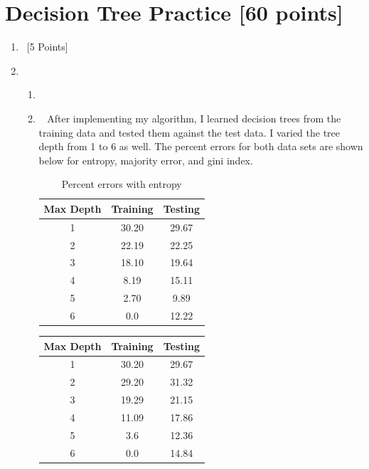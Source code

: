 \documentclass[12pt, fullpage,letterpaper]{article}
\begin{document}
\section{Decision Tree Practice [60 points]}
\begin{enumerate}
	\item~[5 Points] 


\item~



\begin{enumerate}
\item~

\item~ 
	After implementing my algorithm, I learned decision trees from the training data and tested them against the test data. I varied the tree depth from 1 to 6 as well. The percent errors for both data sets are shown below for entropy, majority error, and gini index.

		\begin{table}[h]
		\centering
		\begin{tabular}{c|cc}
			Max Depth & Training & Testing\\ 
			\hline\hline
			1 & 30.20 & 29.67  \\ \hline
			2 & 22.19 & 22.25  \\ \hline
			3 & 18.10 & 19.64  \\ \hline
			4 & 8.19 & 15.11  \\ \hline
			5 & 2.70 & 9.89 \\ \hline
			6 & 0.0 & 12.22  \\ \hline

		\end{tabular}
		\caption{Percent errors with entropy}
		
		\end{table}	
		
		\begin{table}[h]
		\centering
		\begin{tabular}{c|cc}
			Max Depth & Training & Testing\\ 
			\hline\hline
			1 & 30.20 & 29.67  \\ \hline
			2 & 29.20 & 31.32  \\ \hline
			3 & 19.29 & 21.15  \\ \hline
			4 & 11.09 & 17.86  \\ \hline
			5 & 3.6 & 12.36 \\ \hline
			6 & 0.0 & 14.84  \\ \hline


\end{tabular}
\end{table}
\end{enumerate}
\end{enumerate}
\end{document}

